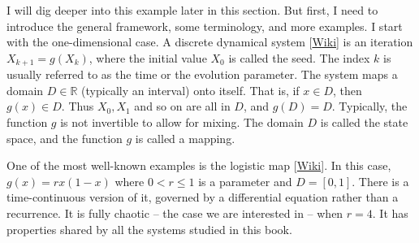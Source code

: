 \documentclass[oneside,10pt]{book}
\begin{document}
I will dig deeper into this example later in this section. But first, I need to introduce the general framework, some terminology, and more examples. I start with the one-dimensional case.  A 
 \textcolor{index}{discrete dynamical system} [\href{https://en.wikipedia.org/wiki/Dynamical_system}{Wiki}] is an iteration $X_{k+1} = g(X_k)$, where the initial value
 $X_0$ is called the \textcolor{index}{seed}. The index $k$ is usually referred to as the time or the 
\textcolor{index}{evolution parameter}. The system maps a domain $D\in \mathbb{R}$ (typically an interval) onto itself. That is, if $x\in D$, then $g(x)\in D$. Thus $X_0, X_1$ and so on are all in $D$, and $g(D) = D$. Typically, the function $g$ is
 not invertible to allow for mixing. The domain $D$ is called the \textcolor{index}{state space}, and 
the function $g$ is called a \textcolor{index}{mapping}.

One of the most well-known examples is the 
\textcolor{index}{logistic map} [\href{https://en.wikipedia.org/wiki/Logistic_map}{Wiki}]. In this case, $g(x) = r x(1-x)$ where $0<r \leq 1$ is a parameter and $D=[0, 1]$. There is a time-continuous version of it, governed by a differential equation rather than a recurrence. It is fully chaotic -- the case we are interested in -- when $r=4$. It has properties shared by all the systems studied in this book. 
\end{document}

